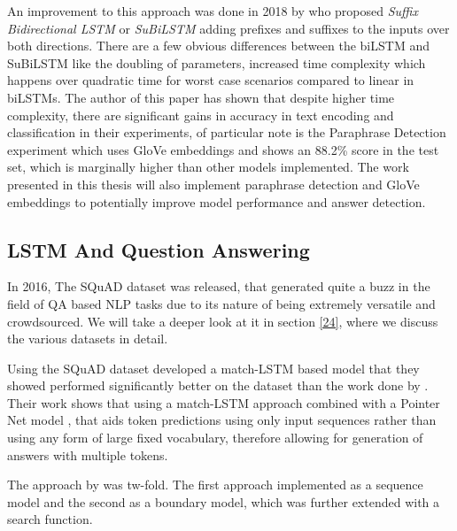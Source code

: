 \documentclass[a4paper,12pt]{report}
\begin{document}
			  An improvement to this approach was done in 2018 by \citep{lstmSubilstm} who proposed \textit{Suffix Bidirectional LSTM} or \textit{SuBiLSTM} adding prefixes and suffixes to the inputs over both directions.  There are a few obvious differences between the biLSTM and SuBiLSTM like the doubling of parameters, increased time complexity which happens over quadratic time for worst case scenarios compared to linear in biLSTMs. 
			  The author of this paper has shown that despite higher time complexity, there are significant gains in accuracy in text encoding and classification in their experiments, of particular note is the Paraphrase Detection experiment which uses GloVe embeddings and shows an 88.2\% score in the test set, which is marginally higher than other models implemented. 
			  The work presented in this thesis will also implement paraphrase detection and GloVe embeddings to potentially improve model performance and answer detection. 
			  
			  \subsection{LSTM And Question Answering}\label{c2lstmqa}
             In 2016, The SQuAD dataset \citep{dataset1} was released, that generated quite a buzz in the field of QA based NLP tasks due to its nature of being extremely versatile and crowdsourced. We will take  a deeper look at it in section \ref{24}, where we discuss the various datasets in detail. 
             
             Using the SQuAD dataset \citep{lstmhu2016question} developed a match-LSTM \citep{lstmMatch} based model that they showed performed significantly better on the dataset than the work done by \citep{dataset1}. Their work shows that using a match-LSTM approach combined with a Pointer Net model \citep{lstmPointer}, that aids token predictions using only input sequences rather than using any form of large fixed vocabulary, therefore allowing for generation of answers with multiple tokens. 
             
             The approach by \citep{lstmhu2016question} was tw-fold. The first approach implemented as a sequence model and the second as a boundary model, which was further extended with a search function.
             
\end{document}
